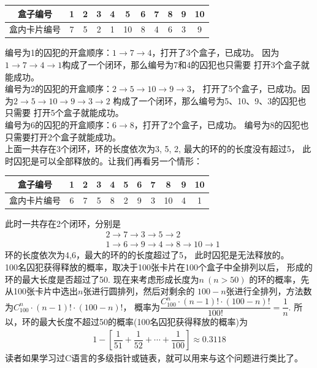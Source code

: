 \begin{enumerate}[label={【\textbf{例\thechapter.\arabic*}】},
 leftmargin=\inteval{\myenumleftmargin}pt,
 itemsep=\inteval{\myenumitempsep}pt,
 itemindent=\inteval{\myenumitemindent}pt]
\begin{table}[H]
\begin{tabular}{|c|c|c|c|c|c|c|c|c|c|c|}
        \hline
        盒子编号  & 1 & 2 & 3 & 4 & 5 & 6 & 7 & 8 & 9 & 10 \\
        \hline
        盒内卡片编号  & 7 & 5 & 2 & 1 & 10 & 8 & 4 & 6 & 3 & 9  \\
        \hline
    \end{tabular}
\end{table}
\vspace{-4mm}
编号为1的囚犯的开盒顺序：$ 1 \to 7 \to 4 $，打开了3个盒子，已成功。
因为$ 1 \to 7 \to 4 \to 1$构成了一个闭环，那么编号为7和4的囚犯也只需要
打开3个盒子就能成功。\\
编号为2的囚犯的开盒顺序：$ 2 \to 5 \to 10 \to 9 \to 3 $，
打开了5个盒子，已成功。因为$ 2 \to 5 \to 10 \to 9 \to 3 \to 2$
构成了一个闭环，那么编号为5、10、9、3的囚犯也只需要
打开5个盒子就能成功。\\
编号为6的囚犯的开盒顺序：$ 6 \to 8 $，打开了2个盒子，已成功。
编号为8的囚犯也只需要打开2个盒子就能成功。\\
上面一共存在3个闭环，环的长度依次为3, 5, 2, 最大的环的的长度没有超过5，
此时囚犯是可以全部释放的。让我们再看另一个情形：
\begin{table}[H] 
    \centering
    \renewcommand\arraystretch{1}
    \begin{tabular}{|c|c|c|c|c|c|c|c|c|c|c|}
        \hline
        盒子编号  & 1 & 2 & 3 & 4 & 5 & 6 & 7 & 8 & 9 & 10 \\
        \hline
        盒内卡片编号  & 6 & 7 & 5 & 8 & 2 & 9 & 3 & 10 & 4 & 1  \\
        \hline
    \end{tabular}
\end{table}
\vspace{-4mm}
此时一共存在2个闭环，分别是
\begin{align*}
    & 2 \to 7 \to 3 \to 5 \to 2 \\
    & 1 \to 6 \to 9 \to 4 \to 8 \to 10 \to 1
\end{align*}
环的长度依次为4,6，最大的环的的长度超过了5，
此时囚犯是无法释放的。\\
100名囚犯获得释放的概率，取决于100张卡片在100个盒子中全排列以后，
形成的环的最大长度是否超过了50. 现在来考虑形成长度为$n\ (n>50)$
的环的概率，先从100张卡片中选出$n$张进行圆排列，然后对剩余的
$100-n$张进行全排列，方法数为$C_{100}^n\cdot (n-1)!\cdot (100-n)!$，
概率为$ \dfrac{C_{100}^n\cdot (n-1)!\cdot (100-n)!}{100!}=\dfrac{1}{n} $.
所以，环的最大长度不超过50的概率(100名囚犯获得释放的概率)为
\begin{gather*}
    1-\left[\dfrac{1}{51}+\dfrac{1}{52}+\cdots+
    \dfrac{1}{100}\right]\approx 0.3118
\end{gather*}
读者如果学习过C语言的多级指针或链表，就可以用来与这个问题进行类比了。


\end{enumerate}
